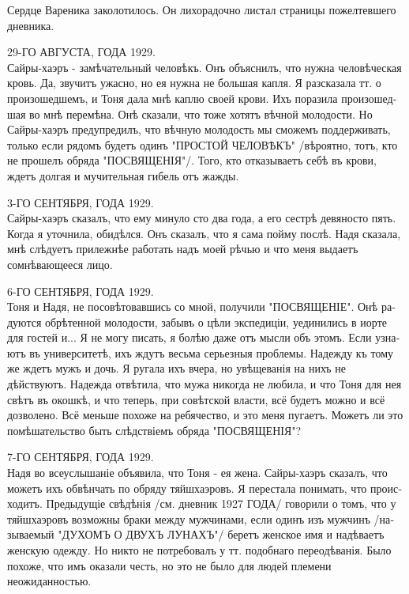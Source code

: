 \documentclass[a5paper,12pt,fleqn]{extbook}\usepackage{cooltooltips}\usepackage{polyglossia}\setdefaultlanguage[babelshorthands=true]{russian}\setotherlanguage{english}\defaultfontfeatures{Ligatures=TeX,Mapping=tex-text} \usepackage{xcolor}\definecolor{lightgray}{HTML}{bbbbbb}\color{lightgray}\newcommand{\ml}[3]{\textenglish{\textcolor{black}{#3}}}
\newcommand{\oldtyping}[1]{{\hspace{0.1em}\oldfont\small{#1}\par}\hspace{0.1em}}
\begin{document}
Сердце Вареника заколотилось.
Он лихорадочно листал страницы пожелтевшего дневника.

\oldtyping{
29-ГО АВГУСТА, ГОДА 1929.\\
Сайры-хаэръ - замѣчательный человѣкъ.
Онъ объяснилъ, что нужна человѣческая кровь.
Да, звучитъ ужасно, но ея нужна не большая капля.
Я разсказала тт. о произошедшемъ, и Тоня дала мнѣ каплю своей крови.
Ихъ поразила произошедшая во мнѣ перемѣна.
Онѣ сказали, что тоже хотятъ вѣчной молодости.
Но Сайры-хаэръ предупредилъ, что вѣчную молодость мы сможемъ поддерживать, только если рядомъ будетъ одинъ "ПРОСТОЙ ЧЕЛОВѢКЪ" /вѣроятно, тотъ, кто не прошелъ обряда "ПОСВЯЩЕНІЯ"/.
Того, кто отказываетъ себѣ въ крови, ждетъ долгая и мучительная гибель отъ жажды.
}

\oldtyping{
3-ГО СЕНТЯБРЯ, ГОДА 1929.\\
Сайры-​хаэръ​ сказалъ, что ему минуло сто два года, а его сестрѣ девяносто пять.
Когда я уточнила, обидѣлся.
Онъ сказалъ, что я сама пойму послѣ.
Надя сказала, мнѣ слѣдуетъ прилежнѣе работать надъ моей рѣчью и что меня выдаетъ сомнѣвающееся лицо.
}

\oldtyping{
6-ГО СЕНТЯБРЯ, ГОДА 1929.\\
Тоня и Надя, не посовѣтовавшись со мной, получили "ПОСВЯЩЕНІЕ".
Онѣ радуются обрѣтенной молодости, забывъ о цѣли экспедиціи, уединились в иорте для гостей и...
Я не могу писать, я болѣю даже отъ мысли объ этомъ.
Если узнаютъ въ университетѣ, ихъ ждутъ весьма серьезныя проблемы.
Надежду къ тому же ждетъ мужъ и дочь.
Я ругала ихъ вчера, но увѣщеванія на нихъ не дѣйствуютъ.
Надежда отвѣтила, что мужа никогда не любила, и что Тоня для ​нея​ свѣтъ въ окошкѣ, и что теперь, при совѣтской власти, ​всё​ будетъ можно и ​всё​ дозволено.
Всё меньше похоже на ребячество, и это меня пугаетъ.
Можетъ ли это помѣшательство быть слѣдствіемъ обряда "ПОСВЯЩЕНІЯ"?
}

\oldtyping{
7-ГО СЕНТЯБРЯ, ГОДА 1929.\\
Надя во всеуслышаніе объявила, что Тоня - ​ея​ жена.
Сайры-​хаэръ​ сказалъ, что можетъ ихъ обвѣнчать по обряду тяйшхаэровъ.
Я перестала понимать, что происходитъ.
Предыдущіе​ свѣдѣнія /см. дневник 1927 ГОДА/ говорили о томъ, что у тяйшхаэровъ возможны браки между мужчинами, если одинъ изъ мужчинъ /называемый "ДУХОМЪ О ДВУХЪ ЛУНАХЪ"/ беретъ женское имя и надѣваетъ женскую одежду.
Но никто не потребовалъ у ​тт​. подобнаго переодѣванія.
Было похоже, что имъ оказали честь, но это не было для людей племени неожиданностью.
}
\end{document}

